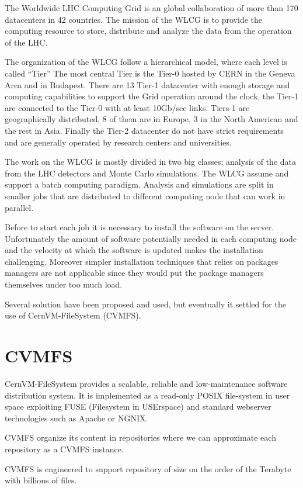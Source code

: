 The Worldwide LHC Computing Grid is an global collaboration of more than 170
datacenters in 42 countries.  The mission of the WLCG is to provide the
computing resource to store, distribute and analyze the data from the operation
of the LHC.

The organization of the WLCG follow a hierarchical model, where each level is
called “Tier” The most central Tier is the Tier-0 hosted by CERN in the Geneva
Area and in Budapest. There are 13 Tier-1 datacenter with enough storage and
computing capabilities to support the Grid operation around the clock, the
Tier-1 are connected to the Tier-0 with at least 10Gb/sec links.  Tiers-1 are
geographically distributed, 8 of them are in Europe, 3 in the North American
and the rest in Asia. Finally the Tier-2 datacenter do not have strict
requirements and are generally operated by research centers and universities.

The work on the WLCG is mostly divided in two big classes: analysis of the data
from the LHC detectors and Monte Carlo simulations.  The WLCG assume and
support a batch computing paradigm. Analysis and simulations are split in
smaller jobs that are distributed to different computing node that can work in
parallel.

Before to start each job it is necessary to install the software on the server.
Unfortunately the amount of software potentially needed in each computing node
and the velocity at which the software is updated makes the installation
challenging. Moreover simpler installation techniques that relies on packages
managers are not applicable since they would put the package managers
themselves under too much load.

Several solution have been proposed and used, but eventually it settled for the
use of CernVM-FileSystem (CVMFS).

\section{CVMFS}

CernVM-FileSystem provides a scalable, reliable and low-maintenance software
distribution system. It is implemented as a read-only POSIX file-system in user
space exploiting FUSE (Filesystem in USErspace) and standard webserver
technologies such as Apache or NGNIX.

CVMFS organize its content in repositories where we can approximate each
repository as a CVMFS instance.

CVMFS is engineered to support repository of size on the order of the Terabyte
with billions of files.

